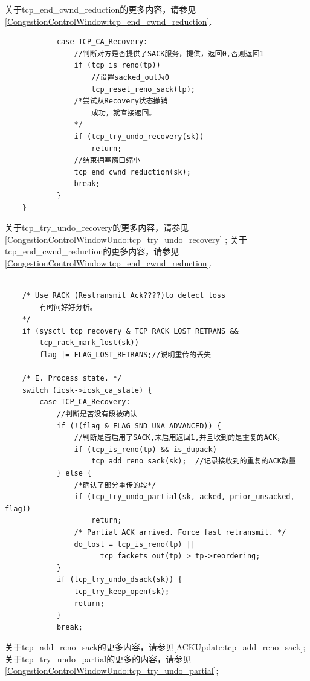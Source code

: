     关于tcp\_end\_cwnd\_reduction的更多内容，请参见\ref{CongestionControlWindow:tcp_end_cwnd_reduction}.
\begin{verbatim}
            case TCP_CA_Recovery:
                //判断对方是否提供了SACK服务，提供，返回0,否则返回1
                if (tcp_is_reno(tp))
                    //设置sacked_out为0
                    tcp_reset_reno_sack(tp);
                /*尝试从Recovery状态撤销
                    成功，就直接返回。
                */
                if (tcp_try_undo_recovery(sk))
                    return;
                //结束拥塞窗口缩小
                tcp_end_cwnd_reduction(sk);
                break;
            }
    }
\end{verbatim}

    关于tcp\_try\_undo\_recovery的更多内容，请参见\ref{CongestionControlWindowUndo:tcp_try_undo_recovery}   ;
    关于tcp\_end\_cwnd\_reduction的更多内容，请参见\ref{CongestionControlWindow:tcp_end_cwnd_reduction}.
    
\begin{verbatim}

    /* Use RACK (Restransmit Ack????)to detect loss 
        有时间好好分析。    
    */
    if (sysctl_tcp_recovery & TCP_RACK_LOST_RETRANS &&
        tcp_rack_mark_lost(sk))
        flag |= FLAG_LOST_RETRANS;//说明重传的丢失

    /* E. Process state. */
    switch (icsk->icsk_ca_state) {
        case TCP_CA_Recovery:
            //判断是否没有段被确认
            if (!(flag & FLAG_SND_UNA_ADVANCED)) {
                //判断是否启用了SACK,未启用返回1,并且收到的是重复的ACK，                
                if (tcp_is_reno(tp) && is_dupack)
                    tcp_add_reno_sack(sk);  //记录接收到的重复的ACK数量
            } else {
                /*确认了部分重传的段*/
                if (tcp_try_undo_partial(sk, acked, prior_unsacked, flag))
                    return;
                /* Partial ACK arrived. Force fast retransmit. */
                do_lost = tcp_is_reno(tp) ||
                      tcp_fackets_out(tp) > tp->reordering;
            }
            if (tcp_try_undo_dsack(sk)) {
                tcp_try_keep_open(sk);
                return;
            }
            break;
\end{verbatim}

    关于tcp\_add\_reno\_sack的更多内容，请参见\ref{ACKUpdate:tcp_add_reno_sack};
    关于tcp\_try\_undo\_partial的更多的内容，请参见\ref{CongestionControlWindowUndo:tcp_try_undo_partial};
    
